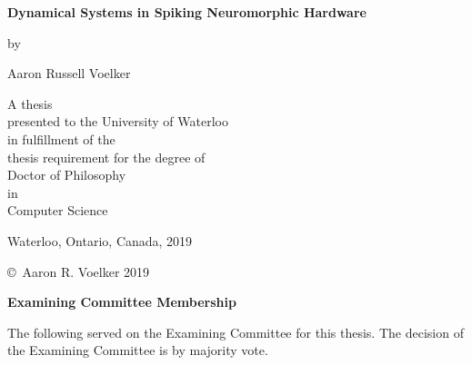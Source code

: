 \pagestyle{empty}

\begin{titlepage}
  \begin{center}
    \vspace*{1.0cm}

    \Huge
    {\bf Dynamical Systems in Spiking Neuromorphic Hardware}

    \vspace*{1.0cm}

    \normalsize
    by \\

    \vspace*{1.0cm}

    \Large
    Aaron Russell Voelker \\

    \vspace*{3.0cm}

    \normalsize
    A thesis \\
    presented to the University of Waterloo \\
    in fulfillment of the \\
    thesis requirement for the degree of \\
    Doctor of Philosophy \\
    in \\
    Computer Science \\

    \vspace*{2.0cm}

    Waterloo, Ontario, Canada, 2019 \\

    \vspace*{1.0cm}

    \copyright\ Aaron R. Voelker 2019 \\
  \end{center}
\end{titlepage}

\pagestyle{plain}
\setcounter{page}{2}

\cleardoublepage

\begin{center}\textbf{Examining Committee Membership}\end{center}

\noindent
The following served on the Examining Committee for this thesis.
The decision of the Examining Committee is by majority vote.

